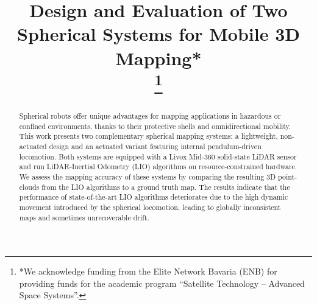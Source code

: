 \documentclass[a4paper, conference]{IEEEtran}
\begin{document}
\title{Design and Evaluation of Two Spherical Systems for Mobile 3D Mapping*\\

\thanks{*We acknowledge funding from the Elite Network Bavaria (ENB) 
for providing funds for the academic program ``Satellite Technology -- Advanced Space Systems''.}
}

\author{
}

\maketitle

\begin{abstract}
Spherical robots offer unique advantages for mapping applications in hazardous or confined environments, thanks to their protective shells and omnidirectional mobility. 
This work presents two complementary spherical mapping systems: a lightweight, non-actuated design and an actuated variant featuring internal pendulum-driven locomotion. 
Both systems are equipped with a Livox Mid-360 solid-state LiDAR sensor and run LiDAR-Inertial Odometry (LIO) algorithms on resource-constrained hardware. 
We assess the mapping accuracy of these systems by comparing the resulting 3D point-clouds from the LIO algorithms to a ground truth map.
The results indicate that the performance of state-of-the-art LIO algorithms deteriorates due to the high dynamic movement introduced by the spherical locomotion, leading to globally inconsistent maps and sometimes unrecoverable drift.
\end{abstract}
\end{document}
